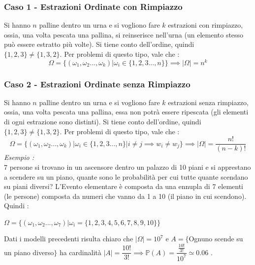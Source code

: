 \documentclass[12pt, letterpaper]{article}
\begin{document}
 \subsubsection{Caso 1 - Estrazioni Ordinate con Rimpiazzo}
Si hanno \(n\) palline dentro un urna e si vogliono fare \(k\) estrazioni con rimpiazzo, ossia, una volta
pescata una pallina, si reinserisce nell'urna (un elemento stesso può essere estratto più volte). Si tiene 
conto dell'ordine, quindi \(\{1,2,3\}\ne\{1,3,2\}\). Per problemi di questo tipo, vale che : 
\begin{equation}
    \Omega = \{(\omega_1,\omega_2...,\omega_k) | \omega_i \in \{1,2,3...,n\}\} \implies |\Omega|= n^k
\end{equation}
\subsubsection{Caso 2 - Estrazioni Ordinate senza Rimpiazzo}
Si hanno \(n\) palline dentro un urna e si vogliono fare \(k\) estrazioni senza rimpiazzo, ossia, una volta
pescata una pallina, essa non potrà essere ripescata (gli elementi di ogni estrazione sono distinti). Si tiene 
conto dell'ordine, quindi \(\{1,2,3\}\ne\{1,3,2\}\). Per problemi di questo tipo, vale che : 
\begin{equation}
    \Omega = \{(\omega_1,\omega_2...,\omega_k) | \omega_i \in \{1,2,3...,n\}|i\ne j \implies w_i\ne w_j\} \implies |\Omega|= \dfrac{n!}{(n-k)!}
\end{equation}
\textit{Esempio :}\\
7 persone si trovano in un ascensore dentro un palazzo di 10 piani e si apprestano a scendere su un piano,
quante sono le probabilità per cui tutte quante scendano su piani diversi? L'Evento elementare è 
composta da una ennupla di 7 elementi (le persone) composta da numeri che vanno da 1 a 10 (il piano in cui scendono).
Quindi : \\\begin{center} \(\Omega = \{(\omega_1,\omega_2...,\omega_7)|\omega_i = \{1,2,3,4,5,6,7,8,9,10\}\}\)
\end{center}
Dati i modelli precedenti risulta chiaro che \(|\Omega|=10^7\) e \(A=\{\)Ognuno scende su un piano diverso\(\}\) ha cardinalità
 \(|A|=\dfrac{10!}{3!}\implies \mathbb{P}(A)=\dfrac{\frac{10!}{3!}}{10^7}\simeq0.06\) .
\end{document}
